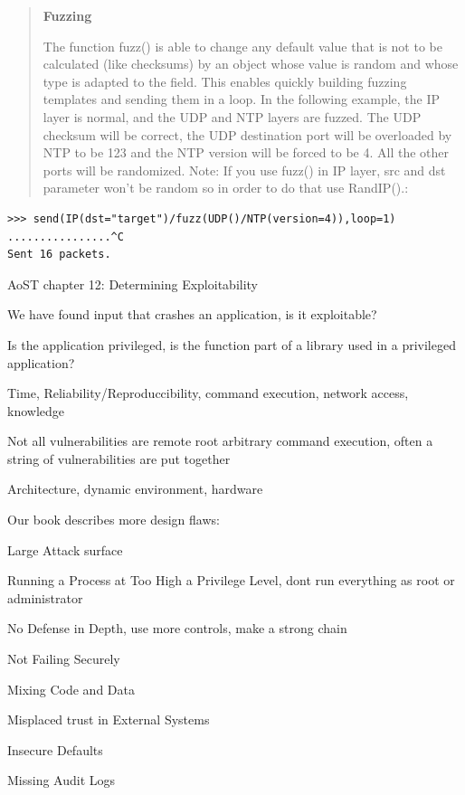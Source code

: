 \documentclass[Screen16to9,17pt]{foils}
\begin{document}

\begin{quote}{\bf
Fuzzing}

The function fuzz() is able to change any default value that is not to be calculated (like checksums) by an object whose value is random and whose type is adapted to the field. This enables quickly building fuzzing templates and sending them in a loop. In the following example, the IP layer is normal, and the UDP and NTP layers are fuzzed. The UDP checksum will be correct, the UDP destination port will be overloaded by NTP to be 123 and the NTP version will be forced to be 4. All the other ports will be randomized. Note: If you use fuzz() in IP layer, src and dst parameter won’t be random so in order to do that use RandIP().:
\end{quote}

\begin{verbatim}
>>> send(IP(dst="target")/fuzz(UDP()/NTP(version=4)),loop=1)
................^C
Sent 16 packets.
\end{verbatim}




\begin{list2}
\item AoST chapter 12: Determining Exploitability
\item We have found input that crashes an application, is it exploitable?
\item Is the application privileged, is the function part of a library used in a privileged application?
\item Time, Reliability/Reproduccibility, command execution, network access, knowledge
\item Not all vulnerabilities are remote root arbitrary command execution, often a string of vulnerabilities are put together
\item Architecture, dynamic environment, hardware
\end{list2}


Our book describes more design flaws:
\begin{list2}
\item Large Attack surface
\item Running a Process at Too High a Privilege Level, dont run everything as root or administrator
\item No Defense in Depth, use more controls, make a strong chain
\item Not Failing Securely
\item Mixing Code and Data
\item Misplaced trust in External Systems
\item Insecure Defaults
\item Missing Audit Logs
\end{list2}
\end{document}
